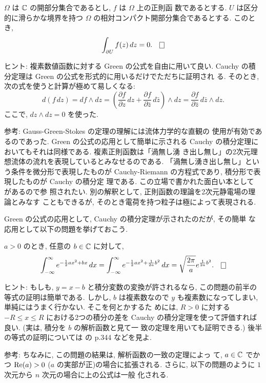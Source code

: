 \documentclass[12pt,twoside]{jarticle}
\def\C{{\Bbb C}} %
\def\Repart{\mathop{\text{\rm Re}}\nolimits} %
\def\pd#1#2{\frac{\partial #1}{\partial #2}}
\begin{document}
\begin{question}[Cauchyの積分定理]
  $\Omega$ は $\C$ の開部分集合であるとし, $f$ は $\Omega$ 上の正則函
  数であるとする. $U$ は区分的に滑らかな境界を持つ %
  $\Omega$ の相対コンパクト開部分集合であるとする. このとき, 
  \[
    \int_{\partial U} f(z)\,dz = 0.
  \qed
  \]
\end{question}

\noindent ヒント: 複素数値函数に対する Green の公式を自由に用いて良い.
Cauchy の積分定理は Green の公式を形式的に用いるだけでただちに証明され
る. そのとき, 次の式を使うと計算が極めて易しくなる:
\[
  d(f\,dz) = df \wedge dz
  = \left( \pd{f}{z}\,dz + \pd{f}{\bar z}\,d\bar{z} \right) \wedge dz
  = \pd{f}{\bar z}\,d\bar{z} \wedge dz.
\]
ここで, $dz\wedge dz = 0$ を使った. 

\noindent 参考: Gauss-Green-Stokes の定理の理解には流体力学的な直観の
使用が有効であるのであった. Green の公式の応用として簡単に示される 
Cauchy の積分定理においてもそれは同様である. 複素正則函数は「渦無し湧
き出し無し」の2次元理想流体の流れを表現しているとみなせるのである. 
「渦無し湧き出し無し」という条件を微分形で表現したものが 
Cauchy-Riemann の方程式であり, 積分形で表現したものが Cauchy の積分定
理である. この立場で書かれた面白い本として \cite{Imai}{} があるので参
照されたい. 別の解釈として, 正則函数の理論を2次元静電場の理論とみなす
こともできるが, そのとき電荷を持つ粒子は極によって表現される. 

Green の公式の応用として, Cauchy の積分定理が示されたのだが, その簡単
な応用として以下の問題を挙げておこう.

\begin{question}
  $a > 0$ のとき, 任意の $b \in\C$ に対して, 
  \[
    \int_{-\infty}^\infty e^{- \frac{1}{2} ax^2  + bx} \,dx
    =
    \int_{-\infty}^\infty e^{- \frac{1}{2} a x^2 + \frac{1}{2a}b^2 } \,dx
    =
    \sqrt{\frac{2\pi}{a}} e^{\frac{1}{2a}b^2}.
  \qed
  \]%
\end{question}

\noindent ヒント: もしも, $y = x - b$ と積分変数の変換が許されるなら, 
この問題の前半の等式の証明は簡単である. しかし, $b$ は複素数なので %
$y$ も複素数になってしまい, 単純にはうまく行かない. そこを何とかするた
めには, $R>0$ に対する $-R \le x \le R$ における2つの積分の差を Cauchy 
の積分定理を使って評価すれば良い. (実は, 積分を $b$ の解析函数と見て一
致の定理を用いても証明できる.) 後半の等式の証明については %
\cite{Takagi}{} の p.344 などを見よ.

\noindent 参考: ちなみに, この問題の結果は, 解析函数の一致の定理によっ
て, $a\in\C$ でかつ $\Repart(a)> 0$ ($a$ の実部が正)の場合に拡張される. 
さらに, 以下の問題のように $1$ 次元から $n$ 次元の場合に上の公式は一般
化される.
\end{document}
